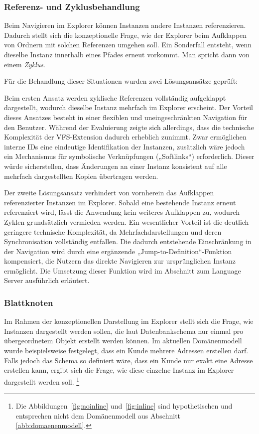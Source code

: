 \subsubsection*{Referenz- und Zyklusbehandlung}
\label{sec:referenz-zyklusbehandlung}
Beim Navigieren im Explorer können Instanzen andere Instanzen referenzieren. Dadurch stellt sich die konzeptionelle Frage, wie der Explorer beim Aufklappen von Ordnern mit solchen Referenzen umgehen soll. Ein Sonderfall entsteht, wenn dieselbe Instanz innerhalb eines Pfades erneut vorkommt. Man spricht dann von einem \textit{Zyklus}. 

Für die Behandlung dieser Situationen wurden zwei Lösungsansätze geprüft:

Beim ersten Ansatz werden zyklische Referenzen vollständig aufgeklappt dargestellt, wodurch dieselbe Instanz mehrfach im Explorer erscheint. Der Vorteil dieses Ansatzes besteht in einer flexiblen und uneingeschränkten Navigation für den Benutzer. Während der Evaluierung zeigte sich allerdings, dass die technische Komplexität der VFS-Extension dadurch erheblich zunimmt. Zwar ermöglichen interne IDs eine eindeutige Identifikation der Instanzen, zusätzlich wäre jedoch ein Mechanismus für symbolische Verknüpfungen („Softlinks“) erforderlich. Dieser würde sicherstellen, dass Änderungen an einer Instanz konsistent auf alle mehrfach dargestellten Kopien übertragen werden.

Der zweite Lösungsansatz verhindert von vornherein das Aufklappen referenzierter Instanzen im Explorer. Sobald eine bestehende Instanz erneut referenziert wird, lässt die Anwendung kein weiteres Aufklappen zu, wodurch Zyklen grundsätzlich vermieden werden. Ein wesentlicher Vorteil ist die deutlich geringere technische Komplexität, da Mehrfachdarstellungen und deren Synchronisation vollständig entfallen. Die dadurch entstehende Einschränkung in der Navigation wird durch eine ergänzende „Jump-to-Definition“-Funktion kompensiert, die Nutzern das direkte Navigieren zur ursprünglichen Instanz ermöglicht. Die Umsetzung dieser Funktion wird im Abschnitt zum Language Server ausführlich erläutert.

\subsubsection*{Blattknoten}
\label{sec:blattknoten}
Im Rahmen der konzeptionellen Darstellung im Explorer stellt sich die Frage, wie Instanzen dargestellt werden sollen, die laut Datenbankschema nur einmal pro übergeordnetem Objekt erstellt werden können. Im aktuellen Domänenmodell wurde beispielsweise festgelegt, dass ein Kunde mehrere Adressen erstellen darf. Falls jedoch das Schema so definiert wäre, dass ein Kunde nur exakt eine Adresse erstellen kann, ergibt sich die Frage, wie diese einzelne Instanz im Explorer dargestellt werden soll. \footnote{Die Abbildungen~\ref{fig:noinline} und~\ref{fig:inline} sind hypothetischen und entsprechen nicht dem Domänenmodell aus Abschnitt \ref{abb:domaenenmodell}.}


